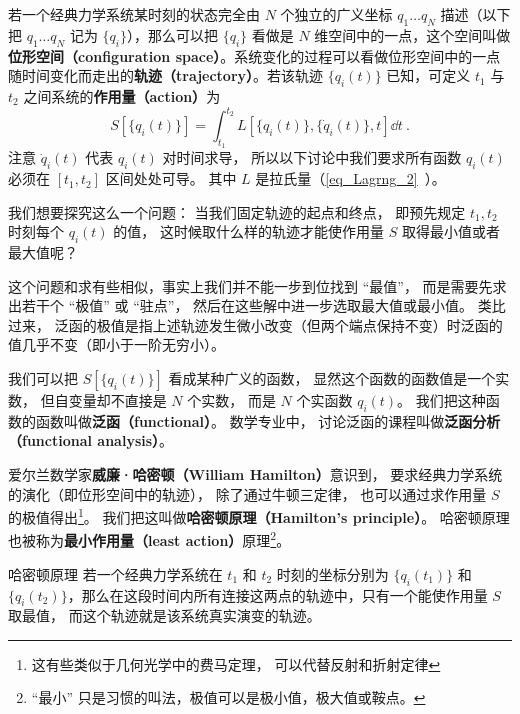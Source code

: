 

若一个经典力学系统某时刻的状态完全由 $N$ 个独立的广义坐标 $q_1\dots q_N$ 描述（以下把 $q_1\dots q_N$ 记为 $\{q_i\}$），那么可以把 $\{q_i\}$ 看做是 $N$ 维空间中的一点，这个空间叫做\textbf{位形空间（configuration space）}。系统变化的过程可以看做位形空间中的一点随时间变化而走出的\textbf{轨迹（trajectory）}。若该轨迹 $\{ {{q_i}(t)} \}$ 已知，可定义 $t_1$ 与 $t_2$ 之间系统的\textbf{作用量（action）}为
\begin{equation}\label{eq_HamPrn_1}
S[\{q_i(t)\}] = \int_{t_1}^{t_2} L[\{q_i(t)\}, \{\dot q_i(t)\}, t] \dd{t}~.
\end{equation}
注意 $\dot q_i(t)$ 代表 $q_i(t)$ 对时间求导， 所以以下讨论中我们要求所有函数 $q_i(t)$ 必须在 $[t_1, t_2]$ 区间处处可导。 其中 $L$ 是拉氏量（\autoref{eq_Lagrng_2}~）。

我们想要探究这么一个问题： 当我们固定轨迹的起点和终点， 即预先规定 $t_1, t_2$ 时刻每个 $q_i(t)$ 的值， 这时候取什么样的轨迹才能使作用量 $S$ 取得最小值或者最大值呢？

这个问题和求有些相似，事实上我们并不能一步到位找到 “最值”， 而是需要先求出若干个 “极值” 或 “驻点”， 然后在这些解中进一步选取最大值或最小值。 类比过来， 泛函的极值是指上述轨迹发生微小改变（但两个端点保持不变）时泛函的值几乎不变（即小于一阶无穷小）。

我们可以把 $S[\{q_i(t)\}]$ 看成某种广义的函数， 显然这个函数的函数值是一个实数， 但自变量却不直接是 $N$ 个实数， 而是 $N$ 个实函数 $q_i(t)$。 我们把这种函数的函数叫做\textbf{泛函（functional）}。%
数学专业中， 讨论泛函的课程叫做\textbf{泛函分析（functional analysis）}。

爱尔兰数学家\textbf{威廉·哈密顿（William Hamilton）}意识到， 要求经典力学系统的演化（即位形空间中的轨迹）， 除了通过牛顿三定律， 也可以通过求作用量 $S$ 的极值得出\footnote{这有些类似于几何光学中的费马定理， 可以代替反射和折射定律}。 我们把这叫做\textbf{哈密顿原理（Hamilton's principle）}。 哈密顿原理也被称为\textbf{最小作用量（least action）}原理\footnote{“最小” 只是习惯的叫法，极值可以是极小值，极大值或鞍点。}。%

\begin{theorem}{哈密顿原理}
若一个经典力学系统在 $t_1$ 和 $t_2$ 时刻的坐标分别为 $\{q_i(t_1)\}$ 和 $\{q_i(t_2)\}$，那么在这段时间内所有连接这两点的轨迹中，只有一个能使作用量 $S$ 取最值， 而这个轨迹就是该系统真实演变的轨迹。
\end{theorem}

